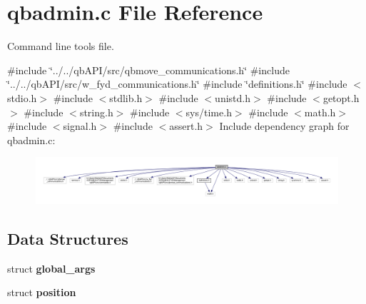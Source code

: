 \section{qbadmin.\+c File Reference}
\label{qbadmin_8c}


Command line tools file.  


{\ttfamily \#include \char`\"{}../../qb\+A\+P\+I/src/qbmove\+\_\+communications.\+h\char`\"{}}\newline
{\ttfamily \#include \char`\"{}../../qb\+A\+P\+I/src/w\+\_\+fyd\+\_\+communications.\+h\char`\"{}}\newline
{\ttfamily \#include \char`\"{}definitions.\+h\char`\"{}}\newline
{\ttfamily \#include $<$stdio.\+h$>$}\newline
{\ttfamily \#include $<$stdlib.\+h$>$}\newline
{\ttfamily \#include $<$unistd.\+h$>$}\newline
{\ttfamily \#include $<$getopt.\+h$>$}\newline
{\ttfamily \#include $<$string.\+h$>$}\newline
{\ttfamily \#include $<$sys/time.\+h$>$}\newline
{\ttfamily \#include $<$math.\+h$>$}\newline
{\ttfamily \#include $<$signal.\+h$>$}\newline
{\ttfamily \#include $<$assert.\+h$>$}\newline
Include dependency graph for qbadmin.\+c\+:
\nopagebreak
\begin{figure}[H]
\begin{center}
\leavevmode
\includegraphics[width=350pt]{qbadmin_8c__incl}
\end{center}
\end{figure}
\subsection*{Data Structures}
\begin{DoxyCompactItemize}
\item 
struct \textbf{ global\+\_\+args}
\item 
struct \textbf{ position}
\end{DoxyCompactItemize}
